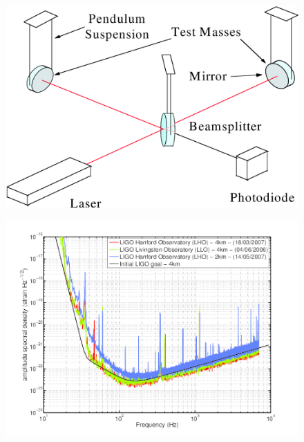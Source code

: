 \documentclass{article}
\begin{document}



\begin{figure}[]
\begin{center}
\includegraphics[width=1\columnwidth]{./figures/fig2/fig2}
\caption{ \protect}
\end{center}
\end{figure}


\begin{figure}[]
\begin{center}
\includegraphics[width=1\columnwidth]{./figures/LIGOsens/LIGOsens}
\caption{ \protect}
\end{center}
\end{figure}
\end{document}
